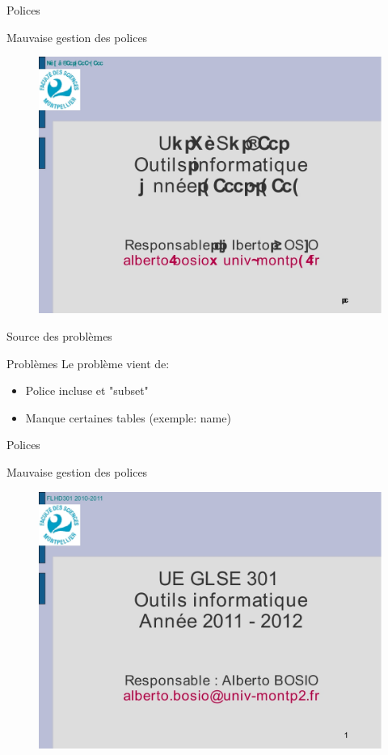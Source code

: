 \begin{frame}{Polices}

	\begin{block}{Mauvaise gestion des polices}
		\begin{figure}[h]
        		\begin{center}
         		\includegraphics[scale=0.17]{images/fail2.jpg} 
        		\end{center}
    		\end{figure}
	\end{block}
\end{frame}

\begin{frame}{Source des problèmes}
\begin{block}{Problèmes}
Le problème vient de:
\begin{itemize}
\item Police incluse et "subset"
\item Manque certaines tables (exemple: name)
\end{itemize}	
\end{block}
\end{frame}

\begin{frame}{Polices}
	\begin{block}{Mauvaise gestion des polices}
		\begin{figure}[h]
    		\begin{center}
     		\includegraphics[scale=0.17]{images/succes.jpg} 
    		\end{center}
		\end{figure}
	\end{block}
\end{frame}

